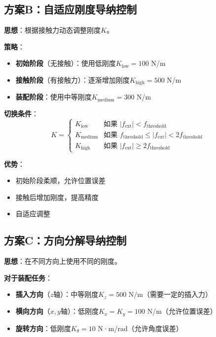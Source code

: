 \documentclass[12pt,a4paper]{article}
\begin{document}
\subsection{方案B：自适应刚度导纳控制}

\textbf{思想}：根据接触力动态调整刚度$K$。

\textbf{策略}：
\begin{itemize}
\item \textbf{初始阶段}（无接触）：使用低刚度$K_{\text{low}} = 100$ N/m
\item \textbf{接触阶段}（有接触力）：逐渐增加刚度$K_{\text{high}} = 500$ N/m
\item \textbf{装配阶段}：使用中等刚度$K_{\text{medium}} = 300$ N/m
\end{itemize}

\textbf{切换条件}：
\begin{equation}
K = \begin{cases}
K_{\text{low}} & \text{如果 } |f_{\text{ext}}| < f_{\text{threshold}} \\
K_{\text{medium}} & \text{如果 } f_{\text{threshold}} \leq |f_{\text{ext}}| < 2f_{\text{threshold}} \\
K_{\text{high}} & \text{如果 } |f_{\text{ext}}| \geq 2f_{\text{threshold}}
\end{cases}
\end{equation}

\textbf{优势}：
\begin{itemize}
\item 初始阶段柔顺，允许位置误差
\item 接触后增加刚度，提高精度
\item 自适应调整
\end{itemize}

\subsection{方案C：方向分解导纳控制}

\textbf{思想}：在不同方向上使用不同的刚度。

\textbf{对于装配任务}：
\begin{itemize}
\item \textbf{插入方向}（$z$轴）：中等刚度$K_z = 500$ N/m（需要一定的插入力）
\item \textbf{横向方向}（$x, y$轴）：低刚度$K_x = K_y = 100$ N/m（允许位置误差）
\item \textbf{旋转方向}：低刚度$K_{\theta} = 10$ N·m/rad（允许角度误差）
\end{itemize}
\end{document}
